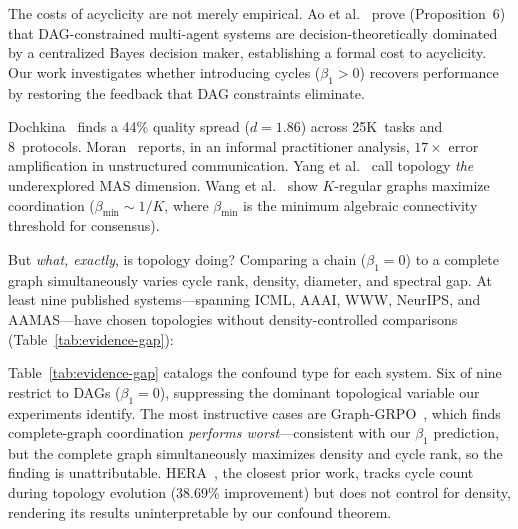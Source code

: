 \documentclass[runningheads]{llncs}
\begin{document}
The costs of acyclicity are not merely empirical.
Ao et al.~\cite{ao2026reliability} prove (Proposition~6) that
DAG-constrained multi-agent systems are decision-theoretically
dominated by a centralized Bayes decision maker, establishing a
formal cost to acyclicity. Our work investigates whether introducing
cycles ($\beta_1 > 0$) recovers performance by restoring the
feedback that DAG constraints eliminate.

Dochkina~\cite{dochkina2026} finds a 44\% quality spread ($d = 1.86$)
across 25K~tasks and 8~protocols. Moran~\cite{moran2025error} reports, in an informal practitioner
analysis, $17\times$ error amplification in unstructured communication.
Yang et al.~\cite{yang2025topology} call topology \emph{the}
underexplored MAS dimension. Wang et al.~\cite{wang2026kregular} show
$K$-regular graphs maximize coordination ($\beta_{\min} \sim 1/K$,
where $\beta_{\min}$ is the minimum algebraic connectivity threshold
for consensus).

But \emph{what, exactly}, is topology doing? Comparing a chain
($\beta_1 = 0$) to a complete graph simultaneously varies cycle rank,
density, diameter, and spectral gap. At least nine published
systems---spanning ICML, AAAI, WWW, NeurIPS, and AAMAS---have chosen
topologies without density-controlled comparisons
(Table~\ref{tab:evidence-gap}):

Table~\ref{tab:evidence-gap} catalogs the confound type for each system. Six of nine restrict to DAGs ($\beta_1 = 0$), suppressing the dominant topological variable our experiments identify. The most instructive cases are Graph-GRPO~\cite{graphgrpo2026}, which finds complete-graph coordination \emph{performs worst}---consistent with our $\beta_1$ prediction, but the complete graph simultaneously maximizes density and cycle rank, so the finding is unattributable. HERA~\cite{hera2026}, the closest prior work, tracks cycle count during topology evolution (38.69\% improvement) but does not control for density, rendering its results uninterpretable by our confound theorem.
\end{document}
